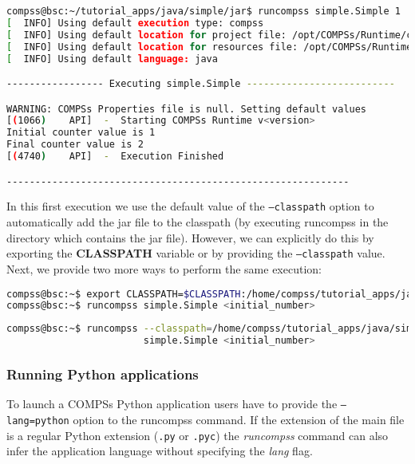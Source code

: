 \begin{lstlisting}[language=bash]
compss@bsc:~/tutorial_apps/java/simple/jar$ runcompss simple.Simple 1
[  INFO] Using default execution type: compss
[  INFO] Using default location for project file: /opt/COMPSs/Runtime/configuration/xml/projects/default_project.xml
[  INFO] Using default location for resources file: /opt/COMPSs/Runtime/configuration/xml/resources/default_resources.xml
[  INFO] Using default language: java

----------------- Executing simple.Simple --------------------------

WARNING: COMPSs Properties file is null. Setting default values
[(1066)    API]  -  Starting COMPSs Runtime v<version>
Initial counter value is 1
Final counter value is 2
[(4740)    API]  -  Execution Finished

------------------------------------------------------------
\end{lstlisting}

In this first execution we use the default value of the \texttt{--classpath} option to automatically add the jar
file to the classpath (by executing runcompss in the directory which contains the jar file). However,
we can explicitly do this by exporting the \textbf{CLASSPATH} variable or by providing the 
\texttt{--classpath} value. Next, we provide two more ways to perform the same execution:

\begin{lstlisting}[language=bash]
compss@bsc:~$ export CLASSPATH=$CLASSPATH:/home/compss/tutorial_apps/java/simple/jar/simple.jar
compss@bsc:~$ runcompss simple.Simple <initial_number>
\end{lstlisting}

\begin{lstlisting}[language=bash]
compss@bsc:~$ runcompss --classpath=/home/compss/tutorial_apps/java/simple/jar/simple.jar 
                        simple.Simple <initial_number>
\end{lstlisting}


\subsubsection{Running Python applications}
To launch a COMPSs Python application users have to provide the \texttt{--lang=python} option to the runcompss command. If the extension
of the main file is a regular Python extension (\verb|.py| or \verb|.pyc|) the \textit{runcompss} command can also infer the 
application language without specifying the \textit{lang} flag. 

